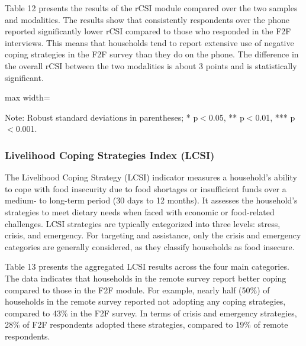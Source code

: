 \documentclass[11pt,harvard]{article}
\begin{document}
	Table 12 presents the results of the rCSI module compared over the two samples and modalities. The results show that consistently respondents over the phone reported significantly lower rCSI compared to those who responded in the F2F interviews.	This means that households tend to report extensive use of negative coping strategies in the F2F survey than they do on the phone. The difference in the overall rCSI between the two modalities is about 3 points and is statistically significant. 
	
	\begin{table}[htbp]
		\centering
		\begin{adjustbox}{max width=\textwidth}
			\begin{threeparttable}
				\caption{Impact of Survey Modality on Reduced Coping Strategy Index Classification}
				\scriptsize%
				 
				\label{tab:rCSI_Modality_BF}
				\begin{tablenotes}
					\item Note: Robust standard deviations in parentheses; * p$<$0.05, ** p$<$0.01, *** p$<$0.001.
				\end{tablenotes}
			\end{threeparttable}
		\end{adjustbox}
	\end{table}
	
	
	\subsubsection{Livelihood Coping Strategies Index (LCSI)}
	
   The Livelihood Coping Strategy (LCSI) indicator measures a household's ability to cope with food insecurity due to food shortages or insufficient funds over a medium- to long-term period (30 days to 12 months). It assesses the household's strategies to meet dietary needs when faced with economic or food-related challenges. LCSI strategies are typically categorized into three levels: stress, crisis, and emergency. For targeting and assistance, only the crisis and emergency categories are generally considered, as they classify households as food insecure.

   Table 13 presents the aggregated LCSI results across the four main categories. The data indicates that households in the remote survey report better coping compared to those in the F2F module. For example, nearly half (50\%) of households in the remote survey reported not adopting any coping strategies, compared to 43\% in the F2F survey. In terms of crisis and emergency strategies, 28\% of F2F respondents adopted these strategies, compared to 19\% of remote respondents.
\end{document}
